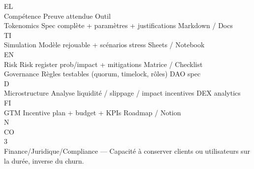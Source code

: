 \documentclass[12pt,landscape,a4paper]{article}
\begin{document}
\vspace{0.5em}
\vspace{0.5em}
\vspace{0.5em}
\vspace{0.5em}
EL\\
Compétence Preuve attendue                                      Outil\\
Tokenomics     Spec complète + paramètres + justifications      Markdown / Docs\\
\vspace{0.5em}
\vspace{0.5em}
\vspace{0.5em}
\vspace{0.5em}
TI\\
Simulation     Modèle rejouable + scénarios stress              Sheets / Notebook\\
\vspace{0.5em}
\vspace{0.5em}
\vspace{0.5em}
\vspace{0.5em}
EN\\
Risk           Risk register prob/impact + mitigations          Matrice / Checklist\\
Governance     Règles testables (quorum, timelock, rôles)       DAO spec\\
\vspace{0.5em}
\vspace{0.5em}
\vspace{0.5em}
\vspace{0.5em}
D\\
Microstructure Analyse liquidité / slippage / impact incentives DEX analytics\\
\vspace{0.5em}
\vspace{0.5em}
\vspace{0.5em}
\vspace{0.5em}
FI\\
GTM            Incentive plan + budget + KPIs                   Roadmap / Notion\\
\vspace{0.5em}
\vspace{0.5em}
N\\
CO\\
3\\
Finance/Juridique/Compliance — Capacité à conserver clients ou utilisateurs sur la durée, inverse du churn.\\
\vspace{0.5em}
\end{document}
